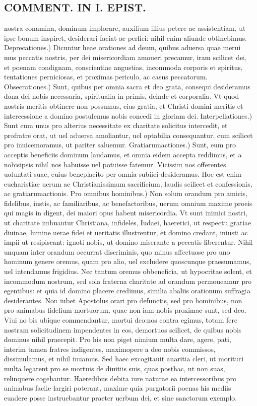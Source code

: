 \documentclass{article}
\begin{document}
\begin{pages}
\section*{COMMENT. IN I. EPIST. }
\marginpar{[ p.480 ]}\pstart nostra conamina, dominum implorare, auxilium illius petere ac assistentiam, ut ipse bonum inspiret, desiderari faciat ac perfici: nihil enim aliunde obtinebimus.  \pend\pstart Deprecationes.) Dicuntur heae orationes ad deum, quibus aduersa quae merui mus peccatis nostris, per dei misericordiam amoueri precamur, iram scilicet dei, et poenam condignam, conscientiae angustias, incommoda corporis et spiritus, tentationes perniciosas, et proximas periculo, ac casus peccatorum. Obsecrationes.) Sunt, quibus per omnia sacra et deo grata, consequi desideramus dona dei nobis necessaria, spiritualia in primis, deinde et corporalia. Vt quod nostris meritis obtinere non possumus, eius gratia, et Christi domini meritis et intercessione a domino postulemus nobis concedi in gloriam dei. Interpellationes.) Sunt cum unus pro alterius necessitate ex charitate solicitus intercedit, et profratre orat, ut uel aduersa amoliantur, uel optabilia consequantur, cum scilicet pro inuicemoramus, ut pariter saluemur. Gratiarumactiones.) Sunt, eum pro acceptis beneficiis dominum laudamus, et omnia eidem accepta reddimus, et a nobisipsis nihil nos habuisse uel potuisse fatemur. Vicissim nos offerentes uoluntati suae, cuius beneplacito per omnia subiiei desideramus. Hoc est enim eucharistiae uerum ac Christianissimum sacrificium, laudis scilicet et confessionis, ac gratiarumactionis. Pro omnibus hominibus.) Non solum orandum pro amicis, fidelibus, iustis, ac familiaribus, ac benefactoribus, uerum omnium maxime proeis qui magis in digent, dei maiori opus habent misericordia. Vt sunt inimici nostri, ut charitate imbuantur Christiana, infideles, Iudaei, haeretici, ut respectu gratiae diuinae, lumine uerae fidei et ueritatis illustrentur, et domino credant, iniusti ac impii ut resipiscant: ignoti nobis, ut domino miserante a peccatis liberentur. Nihil unquam inter orandum occurrat discriminis, quo minus affectuose pro uno hominum genere oremus, quam pro alio, uel excludere quoscunque praesumamus, uel intendamus frigidius. Nec tantum oremus obbeneficia, ut hypocritae solent, et incommodum nostrum, sed sola fraterna charitate ad orandum permoueamur pro egentibus: et quia id domino placere credimus, similia abaliis orationum suffragia desiderantes. Non iubet Apostolus orari pro defunctis, sed pro hominibus, non pro animabus fidelium mortuorum, quae non iam nobis proximae sunt, sed deo. Viui no bis ubique commendantur, mortui deo:nos contra egimus, totam fere nostram solicitudinem impendentes in eos, demortuos scilicet, de quibus nobis dominus nihil praecepit. Pro his non piget nimium multa dare, agere, pati, interim tamen fratres indigentes, maximopere a deo nobis commissos, dissimulamus, et nihil iuuamus. Sed haec excogitauit auaritia cleri, ut morituri multa legarent pro se mortuis de diuitiis suis, quas posthac, ut non suas, relinquere cogebantur. Haeredibus debita iure naturae ea intercessoribus pro animabus facile largiri poterant, maxime quia purgatorii poenas his mediis euadere posse instruebantur praeter uerbum dei, et sine sanctorum exemplo.  \pend

\end{pages}
\end{document}

